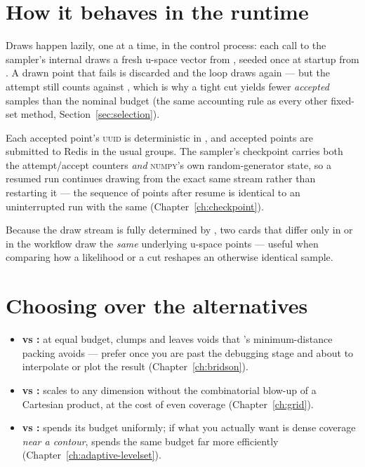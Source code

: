 \section{How it behaves in the runtime}
\label{sec:random-runtime}

Draws happen lazily, one at a time, in the control process: each call to the sampler's
internal  draws a fresh u-space vector from
, seeded once at startup from . A drawn point
that fails  is discarded and the loop draws again --- but the attempt
still counts against , which is why a tight cut yields fewer
\emph{accepted} samples than the nominal budget (the same accounting rule as every
other fixed-set method, Section~\ref{sec:selection}).

Each accepted point's \textsc{uuid} is deterministic in ,
and accepted points are submitted to Redis in the usual
 groups. The sampler's checkpoint carries both the
attempt/accept counters \emph{and} \textsc{numpy}'s own random-generator state, so a
resumed run continues drawing from the exact same stream rather than restarting it ---
the sequence of points after resume is identical to an uninterrupted run with the same
 (Chapter~\ref{ch:checkpoint}).

\begin{jtip}
Because the draw stream is fully determined by , two cards that differ
only in  or in the workflow draw the \emph{same} underlying u-space
points --- useful when comparing how a likelihood or a cut reshapes an otherwise
identical sample.
\end{jtip}

\section{Choosing  over the alternatives}

\begin{itemize}
  \item \textbf{vs :} at equal budget,  clumps and
        leaves voids that 's minimum-distance packing avoids ---
        prefer  once you are past the debugging stage and about to
        interpolate or plot the result (Chapter~\ref{ch:bridson}).
  \item \textbf{vs :}  scales to any dimension without
        the combinatorial blow-up of a Cartesian product, at the cost of even coverage
        (Chapter~\ref{ch:grid}).
  \item \textbf{vs :}  spends its budget
        uniformly; if what you actually want is dense coverage \emph{near a contour},
         spends the same budget far more efficiently
        (Chapter~\ref{ch:adaptive-levelset}).
\end{itemize}

